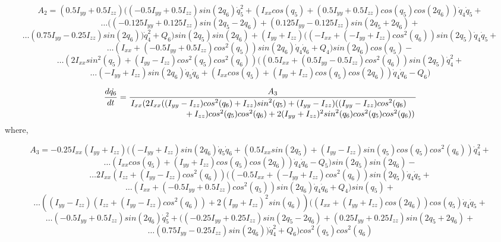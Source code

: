 \documentclass[10pt, letterpaper]{article}
\begin{document}
\[A_{2} =(0.5 I_{yy} + 0.5 I_{zz}) ((- 0.5 I_{yy} + 0.5 I_{zz}) {sin}(2 q_{6}) \dot{q}_{5}^{2} + (I_{xx} {cos}(q_{5}) + (0.5 I_{yy} + 0.5 I_{zz}) {cos}(q_{5}) {cos}(2 q_{6})) \dot{q}_{4} \dot{q}_{5} +
\]
\[
\ldots((- 0.125 I_{yy} + 0.125 I_{zz}) {sin}(2 q_{5} - 2 q_{6}) + (0.125 I_{yy} - 0.125 I_{zz}) {sin}(2 q_{5} + 2 q_{6}) +
\]
\[
\ldots(0.75 I_{yy} - 0.25 I_{zz}) {sin}(2 q_{6})) \dot{q}_{4}^{2} + Q_{6}) {sin}(2 q_{5}) {sin}(2 q_{6}) + (I_{yy} + I_{zz}) ((- I_{xx} + (- I_{yy} + I_{zz}) {cos}^{2}(q_{6})) {sin}(2 q_{5}) \dot{q}_{4} \dot{q}_{5} +
\]
\[
\ldots(I_{xx} + (- 0.5 I_{yy} + 0.5 I_{zz}) {cos}^{2}(q_{5})) {sin}(2 q_{6}) \dot{q}_{4} \dot{q}_{6} + Q_{4}) {sin}(2 q_{6}) {cos}(q_{5}) -
\]
\[
\ldots(2 I_{xx} {sin}^{2}(q_{5}) + (I_{yy} - I_{zz}) {cos}^{2}(q_{5}) {cos}^{2}(q_{6})) ((0.5 I_{xx} + (0.5 I_{yy} - 0.5 I_{zz}) {cos}^{2}(q_{6})) {sin}(2 q_{5}) \dot{q}_{4}^{2} +
\]
\[
\ldots(- I_{yy} + I_{zz}) {sin}(2 q_{6}) \dot{q}_{5} \dot{q}_{6} + (I_{xx} {cos}(q_{5}) + (I_{yy} + I_{zz}) {cos}(q_{5}) {cos}(2 q_{6})) \dot{q}_{4} \dot{q}_{6} - Q_{6})
\]

\[
\frac{d\dot{q_{6}}}{dt} =
\frac{A_{3}}
{\splitfrac{I_{xx}( 2 I_{xx} ((I_{yy}-I_{zz}) {cos}^{2}(q_{6}) + I_{zz}) {sin}^{2}(q_{5}) + 
(I_{yy} - I_{zz}) ((I_{yy}-I_{zz}) {cos}^{2}(q_{6})}
{ + I_{zz}) {cos}^{2}(q_{5}) {cos}^{2}(q_{6}) + 2 (I_{yy} + I_{zz})^{2} {sin}^{2}(q_{6}) {cos}^{2}(q_{5}) {cos}^{2}(q_{6}))}}
\]
where,

\[
A_{3} = - 0.25 I_{xx} (I_{yy} + I_{zz})((- I_{yy} + I_{zz}){sin}(2 q_{6}) \dot{q}_{5} \dot{q}_{6} + (0.5 I_{xx} {sin}(2 q_{5}) + (I_{yy} - I_{zz}) {sin}(q_{5}) {cos}(q_{5}) {cos}^{2}(q_{6})) \dot{q}_{4}^{2}+
\]
\[
\ldots(I_{xx} {cos}(q_{5}) + (I_{yy} + I_{zz}) {cos}(q_{5}) {cos}(2 q_{6})) \dot{q}_{4} \dot{q}_{6} - Q_{5}) {sin}(2 q_{5}) {sin}(2 q_{6}) - 
\]
\[
\ldots2 I_{xx} (I_{zz} + (I_{yy} - I_{zz}) {cos}^{2}(q_{6})) ((- 0.5 I_{xx} + (- I_{yy} + I_{zz}) {cos}^{2}(q_{6})) {sin}(2 q_{5}) \dot{q}_{4} \dot{q}_{5} +
\]
\[
\ldots(I_{xx} + (- 0.5 I_{yy} + 0.5 I_{zz}) {cos}^{2}(q_{5})) {sin}(2 q_{6}) \dot{q}_{4} \dot{q}_{6} + Q_{4}) {sin}(q_{5}) +
\]
\[
\ldots((I_{yy} - I_{zz}) (I_{zz} + (I_{yy} - I_{zz}) {cos}^{2}(q_{6})) + 2 (I_{yy} + I_{zz})^{2} {sin}(q_{6})) ((I_{xx} + (I_{yy} + I_{zz}) {cos}(2 q_{6})) {cos}(q_{5}) \dot{q}_{4} \dot{q}_{5} +
\]
\[
\ldots(- 0.5 I_{yy} + 0.5 I_{zz}) {sin}(2 q_{6}) \dot{q}_{5}^{2} + ((- 0.25 I_{yy} + 0.25 I_{zz}) {sin}(2 q_{5} - 2 q_{6}) + (0.25 I_{yy} + 0.25 I_{zz}) {sin}(2 q_{5} + 2 q_{6}) +
\]
\[
\ldots(0.75 I_{yy} - 0.25 I_{zz}) {sin}(2 q_{6})) \dot{q}_{4}^{2} + Q_{6}) {cos}^{2}(q_{5}) {cos}^{2}(q_{6}) 
\]
\end{document}
